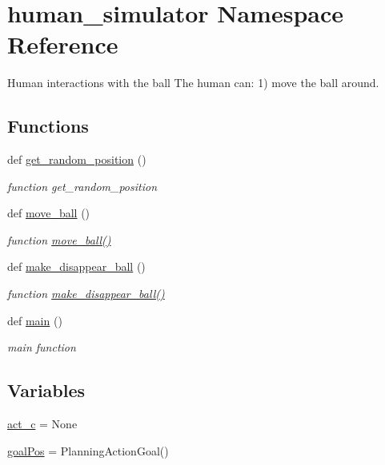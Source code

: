 \hypertarget{namespacehuman__simulator}{}\section{human\+\_\+simulator Namespace Reference}
\label{namespacehuman__simulator}


Human interactions with the ball The human can\+: 1) move the ball around.  


\subsection*{Functions}
\begin{DoxyCompactItemize}
\item 
def \hyperlink{namespacehuman__simulator_a876745e0225b33060ac985ca6ab92ad6}{get\+\_\+random\+\_\+position} ()
\begin{DoxyCompactList}\small\item\em function get\+\_\+random\+\_\+position \end{DoxyCompactList}\item 
def \hyperlink{namespacehuman__simulator_aebb3c3946d1ca4e8a8fe5d6762296cec}{move\+\_\+ball} ()
\begin{DoxyCompactList}\small\item\em function \hyperlink{namespacehuman__simulator_aebb3c3946d1ca4e8a8fe5d6762296cec}{move\+\_\+ball()} \end{DoxyCompactList}\item 
def \hyperlink{namespacehuman__simulator_a4e00db04bb9f513c32ed695f315d525f}{make\+\_\+disappear\+\_\+ball} ()
\begin{DoxyCompactList}\small\item\em function \hyperlink{namespacehuman__simulator_a4e00db04bb9f513c32ed695f315d525f}{make\+\_\+disappear\+\_\+ball()} \end{DoxyCompactList}\item 
def \hyperlink{namespacehuman__simulator_adb91dbb164188ff85ca65a1c0380a16a}{main} ()
\begin{DoxyCompactList}\small\item\em main function \end{DoxyCompactList}\end{DoxyCompactItemize}
\subsection*{Variables}
\begin{DoxyCompactItemize}
\item 
\hyperlink{namespacehuman__simulator_a3df97310032b13c3a872db61817147a4}{act\+\_\+c} = None
\item 
\hyperlink{namespacehuman__simulator_a9c29a9b3b5c8150e808af93b318f0f30}{goal\+Pos} = Planning\+Action\+Goal()
\end{DoxyCompactItemize}


